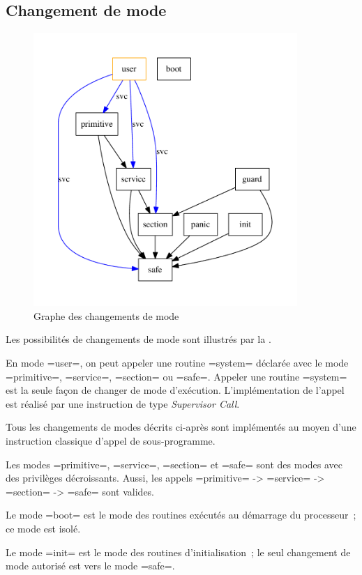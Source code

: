 \subsection{Changement de mode}

\begin{figure}[htbp]
  \centering
  \includegraphics[width=10cm]{chapitres/changement-modes.pdf}
  \caption{Graphe des changements de mode}
\end{figure}

Les possibilités de changements de mode sont illustrés par la .

En mode \plm=user=, on peut appeler une routine \plm=system= déclarée avec le mode \plm=primitive=, \plm=service=, \plm=section= ou \plm=safe=. Appeler une routine \plm=system= est la seule façon de changer de mode d'exécution. L'implémentation de l'appel est réalisé par une instruction de type \emph{Supervisor Call}.

Tous les changements de modes décrits ci-après sont implémentés au moyen d'une instruction classique d'appel de sous-programme.

Les modes \plm=primitive=, \plm=service=, \plm=section= et \plm=safe= sont des modes avec des privilèges décroissants. Aussi, les appels \plm=primitive= -> \plm=service= -> \plm=section= -> \plm=safe= sont valides.

Le mode \plm=boot= est le mode des routines exécutés au démarrage du processeur~; ce mode est isolé.

Le mode \plm=init= est le mode des routines d'initialisation~; le seul changement de mode autorisé est vers le mode \plm=safe=. 

